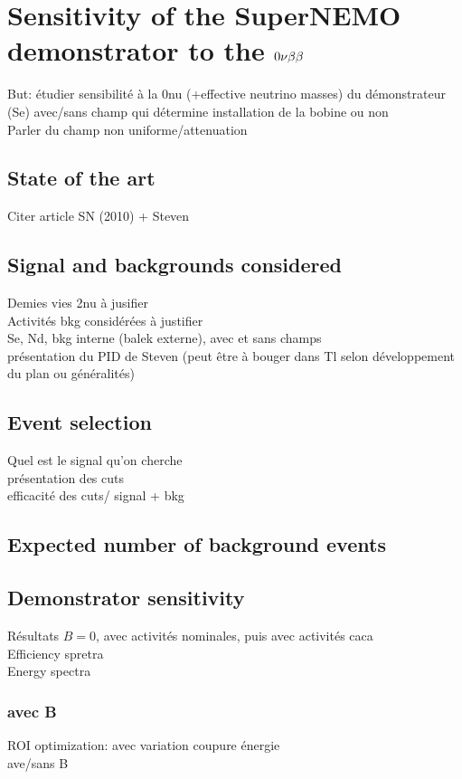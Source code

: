 \chapter{Sensitivity of the SuperNEMO demonstrator to the $0\nu\beta\beta$}
\label{ch:sensitivity}

But: étudier sensibilité à la 0nu (+effective neutrino masses) du démonstrateur (Se) avec/sans champ qui détermine installation de la bobine ou non\\
Parler du champ non uniforme/attenuation

\section{State of the art}
Citer article SN (2010) + Steven
\section{Signal and backgrounds considered}
Demies vies 2nu à jusifier\\
Activités bkg considérées à justifier\\
Se, Nd, bkg interne (balek externe), avec et sans champs\\
présentation du PID de Steven (peut être à bouger dans Tl selon développement du plan ou généralités)
\section{Event selection}
Quel est le signal qu'on cherche\\
présentation des cuts\\
efficacité des cuts/ signal + bkg
\section{Expected number of background events}


\section{Demonstrator sensitivity}
Résultats $B=0$, avec activités nominales, puis avec activités caca\\
Efficiency spretra\\
Energy spectra
\subsection{avec B}
ROI optimization: avec variation coupure énergie\\
ave/sans B
